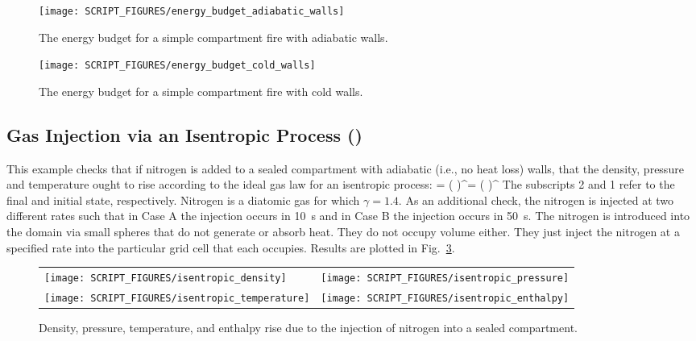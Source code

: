 \documentclass[11pt]{book}
\begin{document}
\begin{figure}[ht]
\centering
\texttt{[image: SCRIPT\_FIGURES/energy\_budget\_adiabatic\_walls]}
\caption[The {\ct energy\_budget\_adiabatic\_walls} test case]{The energy budget for a simple compartment fire with adiabatic walls.}
\label{energy_budget_adiabatic_walls_fig}
\end{figure}

\begin{figure}[ht]
\centering
\texttt{[image: SCRIPT\_FIGURES/energy\_budget\_cold\_walls]}
\caption[The {\ct energy\_budget\_cold\_walls} test case]{The energy budget for a simple compartment fire with cold walls.}
\label{energy_budget_cold_walls_fig}
\end{figure}


\subsection{Gas Injection via an Isentropic Process (\texorpdfstring{}{isentropic})}
\label{isentropic}

This example checks that if nitrogen is added to a sealed compartment with adiabatic (i.e., no heat loss) walls, that the density, pressure and temperature ought to rise according to the ideal gas law for an isentropic process: \be {} = \left(  \right)^\gamma = \left(  \right)^{}  \ee The subscripts 2 and 1 refer to the final and initial state, respectively. Nitrogen is a diatomic gas for which $\gamma=1.4$. As an additional check, the nitrogen is injected at two different rates such that in Case A the injection occurs in 10~s and in Case B the injection occurs in 50~s. The nitrogen is introduced into the domain via small spheres that do not generate or absorb heat. They do not occupy volume either. They just inject the nitrogen at a specified rate into the particular grid cell that each occupies.  Results are plotted in Fig.~\ref{isentropic_fig}.

\begin{figure}[ht]
\begin{tabular*}{\textwidth}{lr}
\texttt{[image: SCRIPT\_FIGURES/isentropic\_density]} &
\texttt{[image: SCRIPT\_FIGURES/isentropic\_pressure]} \\
\texttt{[image: SCRIPT\_FIGURES/isentropic\_temperature]} &
\texttt{[image: SCRIPT\_FIGURES/isentropic\_enthalpy]}
\end{tabular*}
\caption[The  test case]{Density, pressure, temperature, and enthalpy rise due to the injection of nitrogen into a sealed compartment.}
\label{isentropic_fig}
\end{figure}
\end{document}

